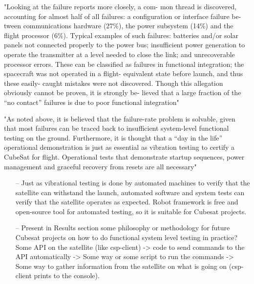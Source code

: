 \documentclass[english,12pt,a4paper,pdftex,elec,utf8]{aaltothesis}
\begin{document}
"Looking at the failure reports more closely, a com-
mon thread is discovered, accounting for almost half
of all failures: a configuration or interface failure be-
tween communications hardware (27\%), the power
subsystem (14\%) and the flight processor (6\%). Typical
examples of such failures: batteries and/or solar panels
not connected properly to the power bus; insufficient
power generation to operate the transmitter at a level
needed to close the link; and unrecoverable processor
errors. These can be classified as failures in functional
integration; the spacecraft was not operated in a flight-
equivalent state before launch, and thus these easily-
caught mistakes were not discovered. Though this
allegation obviously cannot be proven, it is strongly be-
lieved that a large fraction of the “no contact” failures
is due to poor functional integration"\cite{Swart1}\par
"As  noted  above,  it  is  believed  that  the  failure-rate  
problem  is  solvable,  given  that  most  failures  can  be  
traced back to insufficient system-level functional testing  on  the  ground.  Furthermore,  it  is  thought  that  a  
“day  in  the  life”  operational  demonstration  is  just  as  
essential  as  vibration  testing  to  certify  a  CubeSat  for  
flight.  Operational  tests  that  demonstrate  startup  sequences,  power  management  and  graceful  recovery  
from resets are all necessary"\cite{Swart1}\\

\begin{itemize}
\item[--]Just as vibrational testing is done by automated machines to verify that the satellite can withstand the launch, automated software and system tests can verify that the satellite operates as expected. Robot framework is free and open-source tool for automated testing, so it is suitable for Cubesat projects.
\item[--]Present in Results section some philosophy or methodology for future Cubesat projects on how to do functional system level testing in practice? Some API on the satellite (like csp-client) -> code to send commands to the API automatically -> Some way or some script to run the commands -> Some way to gather information from the satellite on what is going on (csp-client prints to the console).
\end{itemize}
\end{document}
